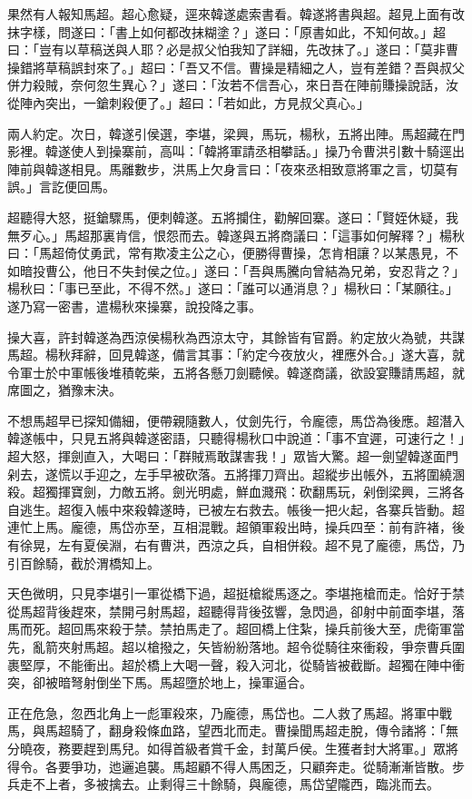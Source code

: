 果然有人報知馬超。超心愈疑，逕來韓遂處索書看。韓遂將書與超。超見上面有改抹字樣，問遂曰：「書上如何都改抹糊塗？」遂曰：「原書如此，不知何故。」超曰：「豈有以草稿送與人耶？必是叔父怕我知了詳細，先改抹了。」遂曰：「莫非曹操錯將草稿誤封來了。」超曰：「吾又不信。曹操是精細之人，豈有差錯？吾與叔父併力殺賊，奈何忽生異心？」遂曰：「汝若不信吾心，來日吾在陣前賺操說話，汝從陣內突出，一鎗刺殺便了。」超曰：「若如此，方見叔父真心。」

兩人約定。次日，韓遂引侯選，李堪，梁興，馬玩，楊秋，五將出陣。馬超藏在門影裡。韓遂使人到操寨前，高叫：「韓將軍請丞相攀話。」操乃令曹洪引數十騎逕出陣前與韓遂相見。馬離數步，洪馬上欠身言曰：「夜來丞相致意將軍之言，切莫有誤。」言訖便回馬。

超聽得大怒，挺鎗驟馬，便刺韓遂。五將攔住，勸解回寨。遂曰：「賢姪休疑，我無歹心。」馬超那裏肯信，恨怨而去。韓遂與五將商議曰：「這事如何解釋？」楊秋曰：「馬超倚仗勇武，常有欺凌主公之心，便勝得曹操，怎肯相讓？以某愚見，不如暗投曹公，他日不失封侯之位。」遂曰：「吾與馬騰向曾結為兄弟，安忍背之？」楊秋曰：「事已至此，不得不然。」遂曰：「誰可以通消息？」楊秋曰：「某願往。」遂乃寫一密書，遣楊秋來操寨，說投降之事。

操大喜，許封韓遂為西涼侯楊秋為西涼太守，其餘皆有官爵。約定放火為號，共謀馬超。楊秋拜辭，回見韓遂，備言其事：「約定今夜放火，裡應外合。」遂大喜，就令軍士於中軍帳後堆積乾柴，五將各懸刀劍聽候。韓遂商議，欲設宴賺請馬超，就席圖之，猶豫末決。

不想馬超早已探知備細，便帶親隨數人，仗劍先行，令龐德，馬岱為後應。超潛入韓遂帳中，只見五將與韓遂密語，只聽得楊秋口中說道：「事不宜遲，可速行之！」超大怒，揮劍直入，大喝曰：「群賊焉敢謀害我！」眾皆大驚。超一劍望韓遂面門剁去，遂慌以手迎之，左手早被砍落。五將揮刀齊出。超縱步出帳外，五將圍繞溷殺。超獨揮寶劍，力敵五將。劍光明處，鮮血濺飛：砍翻馬玩，剁倒梁興，三將各自逃生。超復入帳中來殺韓遂時，已被左右救去。帳後一把火起，各寨兵皆動。超連忙上馬。龐德，馬岱亦至，互相混戰。超領軍殺出時，操兵四至：前有許褚，後有徐晃，左有夏侯淵，右有曹洪，西涼之兵，自相併殺。超不見了龐德，馬岱，乃引百餘騎，截於渭橋知上。

天色微明，只見李堪引一軍從橋下過，超挺槍縱馬逐之。李堪拖槍而走。恰好于禁從馬超背後趕來，禁開弓射馬超，超聽得背後弦響，急閃過，卻射中前面李堪，落馬而死。超回馬來殺于禁。禁拍馬走了。超回橋上住紮，操兵前後大至，虎衛軍當先，亂箭夾射馬超。超以槍撥之，矢皆紛紛落地。超令從騎往來衝殺，爭奈曹兵圍裹堅厚，不能衝出。超於橋上大喝一聲，殺入河北，從騎皆被截斷。超獨在陣中衝突，卻被暗弩射倒坐下馬。馬超墮於地上，操軍逼合。

正在危急，忽西北角上一彪軍殺來，乃龐德，馬岱也。二人救了馬超。將軍中戰馬，與馬超騎了，翻身殺條血路，望西北而走。曹操聞馬超走脫，傳令諸將：「無分曉夜，務要趕到馬兒。如得首級者賞千金，封萬戶侯。生獲者封大將軍。」眾將得令。各要爭功，迆邐追襲。馬超顧不得人馬困乏，只顧奔走。從騎漸漸皆散。步兵走不上者，多被擒去。止剩得三十餘騎，與龐德，馬岱望隴西，臨洮而去。


